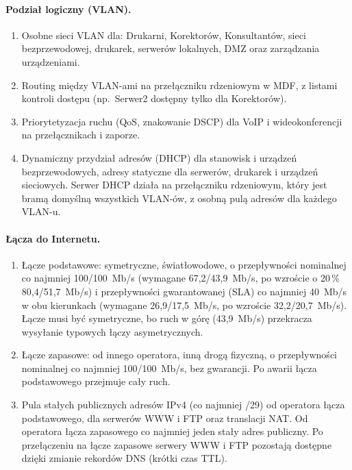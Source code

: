 \documentclass[12pt,a4paper]{article}
\begin{document}
\paragraph{Podział logiczny (VLAN).}
\begin{enumerate}[resume]
  \item Osobne sieci VLAN dla: Drukarni, Korektorów, Konsultantów, sieci
  bezprzewodowej, drukarek, serwerów lokalnych, DMZ oraz zarządzania
  urządzeniami.
  \item Routing między VLAN-ami na przełączniku rdzeniowym w MDF, z listami
  kontroli dostępu (np.\ Serwer2 dostępny tylko dla Korektorów).
  \item Priorytetyzacja ruchu (QoS, znakowanie DSCP) dla VoIP
  i wideokonferencji na przełącznikach i zaporze.
  \item Dynamiczny przydział adresów (DHCP) dla stanowisk i urządzeń
  bezprzewodowych, adresy statyczne dla serwerów, drukarek i urządzeń
  sieciowych. Serwer DHCP działa na przełączniku rdzeniowym, który jest
  bramą domyślną wszystkich VLAN-ów, z osobną pulą adresów dla każdego
  VLAN-u.
\end{enumerate}

\paragraph{Łącza do Internetu.}
\begin{enumerate}[resume]
  \item Łącze podstawowe: symetryczne, światłowodowe, o przepływności
  nominalnej co najmniej 100/100~Mb/s (wymagane 67,2/43,9~Mb/s, po wzroście
  o 20\,\% 80,4/51,7~Mb/s) i przepływności gwarantowanej (SLA) co najmniej
  40~Mb/s w obu kierunkach (wymagane 26,9/17,5~Mb/s, po wzroście
  32,2/20,7~Mb/s). Łącze musi być symetryczne, bo ruch w górę (43,9~Mb/s)
  przekracza wysyłanie typowych łączy asymetrycznych.
  \item Łącze zapasowe: od innego operatora, inną drogą fizyczną,
  o przepływności nominalnej co najmniej 100/100~Mb/s, bez gwarancji. Po
  awarii łącza podstawowego przejmuje cały ruch.
  \item Pula stałych publicznych adresów IPv4 (co najmniej /29) od operatora
  łącza podstawowego, dla serwerów WWW i FTP oraz translacji NAT. Od operatora
  łącza zapasowego co najmniej jeden stały adres publiczny. Po przełączeniu
  na łącze zapasowe serwery WWW i FTP pozostają dostępne dzięki zmianie
  rekordów DNS (krótki czas TTL).
\end{enumerate}
\end{document}
